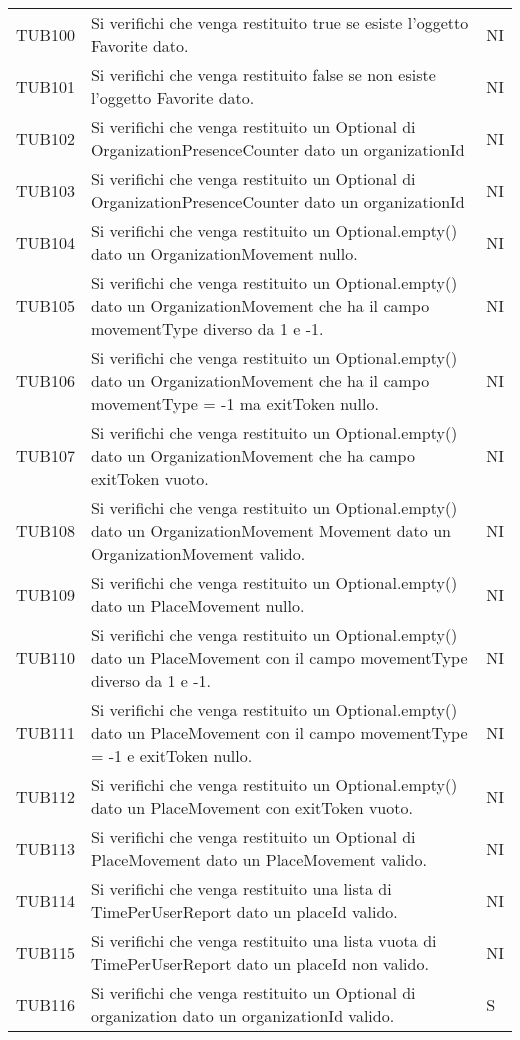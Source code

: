 {\begin{longtable}{ c C{13cm} C{1cm}}
TUB100 & Si verifichi che venga restituito true se esiste l'oggetto Favorite dato. & NI \\
TUB101 & Si verifichi che venga restituito false se non esiste l'oggetto Favorite dato. & NI \\
TUB102 & Si verifichi che venga restituito un Optional di OrganizationPresenceCounter dato un organizationId & NI \\
TUB103 & Si verifichi che venga restituito un Optional di OrganizationPresenceCounter dato un organizationId & NI \\
TUB104 & Si verifichi che venga restituito un Optional.empty()  dato un OrganizationMovement nullo. & NI \\
TUB105 & Si verifichi che venga restituito un Optional.empty() dato un OrganizationMovement che ha il campo movementType diverso da 1 e -1. & NI \\
TUB106 & Si verifichi che venga restituito un Optional.empty() dato un OrganizationMovement che ha il campo movementType = -1 ma exitToken nullo. & NI \\
TUB107 & Si verifichi che venga restituito un Optional.empty() dato un OrganizationMovement che ha campo exitToken vuoto. & NI \\
TUB108 & Si verifichi che venga restituito un Optional.empty() dato un OrganizationMovement Movement  dato un OrganizationMovement valido. & NI \\
TUB109 & Si verifichi che venga restituito un Optional.empty() dato un PlaceMovement nullo. & NI \\
TUB110 & Si verifichi che venga restituito un Optional.empty() dato un PlaceMovement con il campo movementType diverso da 1 e -1. & NI \\
TUB111 & Si verifichi che venga restituito un Optional.empty() dato un PlaceMovement con il campo movementType = -1 e exitToken nullo. & NI \\
TUB112 & Si verifichi che venga restituito un Optional.empty() dato un PlaceMovement con exitToken vuoto. & NI \\
TUB113 & Si verifichi che venga restituito un Optional di PlaceMovement dato un PlaceMovement valido. & NI \\
TUB114 & Si verifichi che venga restituito una lista di TimePerUserReport dato un placeId valido. & NI \\
TUB115 & Si verifichi che venga restituito una lista vuota di TimePerUserReport dato un placeId non valido. & NI \\
TUB116 & Si verifichi che venga restituito un Optional di organization dato un organizationId valido. & S \\

\end{longtable}}
